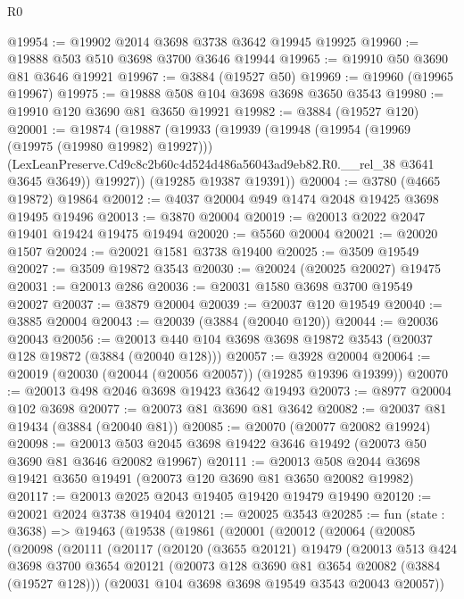 \begin{lexlean}{R0}
\begin{coremodule}
@19954 := @19902 @2014 @3698 @3738 @3642 @19945 @19925
@19960 := @19888 @503 @510 @3698 @3700 @3646 @19944
@19965 := @19910 @50 @3690 @81 @3646 @19921
@19967 := @3884 (@19527 @50)
@19969 := @19960 (@19965 @19967)
@19975 := @19888 @508 @104 @3698 @3698 @3650 @3543
@19980 := @19910 @120 @3690 @81 @3650 @19921
@19982 := @3884 (@19527 @120)
@20001 := @19874
    (@19887
      (@19933
        (@19939
          (@19948
            (@19954 (@19969 (@19975 (@19980 @19982) @19927)))
            (LexLeanPreserve.Cd9c8c2b60c4d524d486a56043ad9eb82.R0.__rel_38 @3641 @3645 @3649))
          @19927))
      (@19285 @19387 @19391))
@20004 := @3780 (@4665 @19872) @19864
@20012 := @4037 @20004 @949 @1474 @2048 @19425 @3698 @19495 @19496
@20013 := @3870 @20004
@20019 := @20013 @2022 @2047 @19401 @19424 @19475 @19494
@20020 := @5560 @20004
@20021 := @20020 @1507
@20024 := @20021 @1581 @3738 @19400
@20025 := @3509 @19549
@20027 := @3509 @19872 @3543
@20030 := @20024 (@20025 @20027) @19475
@20031 := @20013 @286
@20036 := @20031 @1580 @3698 @3700 @19549 @20027
@20037 := @3879 @20004
@20039 := @20037 @120 @19549
@20040 := @3885 @20004
@20043 := @20039 (@3884 (@20040 @120))
@20044 := @20036 @20043
@20056 := @20013 @440 @104 @3698 @3698 @19872 @3543 (@20037 @128 @19872 (@3884 (@20040 @128)))
@20057 := @3928 @20004
@20064 := @20019 (@20030 (@20044 (@20056 @20057)) (@19285 @19396 @19399))
@20070 := @20013 @498 @2046 @3698 @19423 @3642 @19493
@20073 := @8977 @20004 @102 @3698
@20077 := @20073 @81 @3690 @81 @3642
@20082 := @20037 @81 @19434 (@3884 (@20040 @81))
@20085 := @20070 (@20077 @20082 @19924)
@20098 := @20013 @503 @2045 @3698 @19422 @3646 @19492 (@20073 @50 @3690 @81 @3646 @20082 @19967)
@20111 := @20013 @508 @2044 @3698 @19421 @3650 @19491 (@20073 @120 @3690 @81 @3650 @20082 @19982)
@20117 := @20013 @2025 @2043 @19405 @19420 @19479 @19490
@20120 := @20021 @2024 @3738 @19404
@20121 := @20025 @3543
@20285 := fun (state : @3638) =>
  @19463
    (@19538
      (@19861
        (@20001
          (@20012
            (@20064
              (@20085
                (@20098
                  (@20111
                    (@20117
                      (@20120
                        (@3655 @20121)
                        @19479
                        (@20013
                          @513
                          @424
                          @3698
                          @3700
                          @3654
                          @20121
                          (@20073 @128 @3690 @81 @3654 @20082 (@3884 (@19527 @128)))
                          (@20031 @104 @3698 @3698 @19549 @3543 @20043 @20057))

\end{coremodule}
\end{lexlean}

